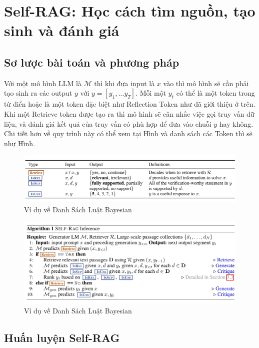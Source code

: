 \documentclass{article}
\begin{document}
\section{Self-RAG: Học cách tìm nguồn, tạo sinh và đánh giá}

\subsection{Sơ lược bài toán và phương pháp}
Với một mô hình LLM là $\mathcal{M}$ thì khi đưa input là $x$ vào thì mô hình sẽ cần phải tạo sinh ra các output $y$ với $y = [y_1,...y_T]$. Mỗi một $y_t$ có thể là một token trong từ điển hoặc là một token đặc biệt như Reflection Token như đã giới thiệu ở trên. Khi một Retrieve token được tạo ra thì mô hình sẽ cân nhắc việc gọi truy vấn dữ liệu, và đánh giá kết quả của truy vấn có phù hợp để đưa vào chuỗi $y$ hay không. Chi tiết hơn về quy trình này có thể xem tại Hình và danh sách các Token thì sẽ như Hình. 

\begin{figure} 
    \centering
    \includegraphics[scale = 0.2]{reflection_token_explanation.jpeg}
    \caption{Ví dụ về Danh Sách Luật Bayesian}
    \label{fig:reflection_token_explanation}
\end{figure}

\begin{figure} 
    \centering
    \includegraphics[scale = 0.2]{self_rag_pseudo_code.jpeg}
    \caption{Ví dụ về Danh Sách Luật Bayesian}
    \label{fig:self_rag_pseudo_code}
\end{figure}

\subsection{Huấn luyện Self-RAG}
\end{document}
